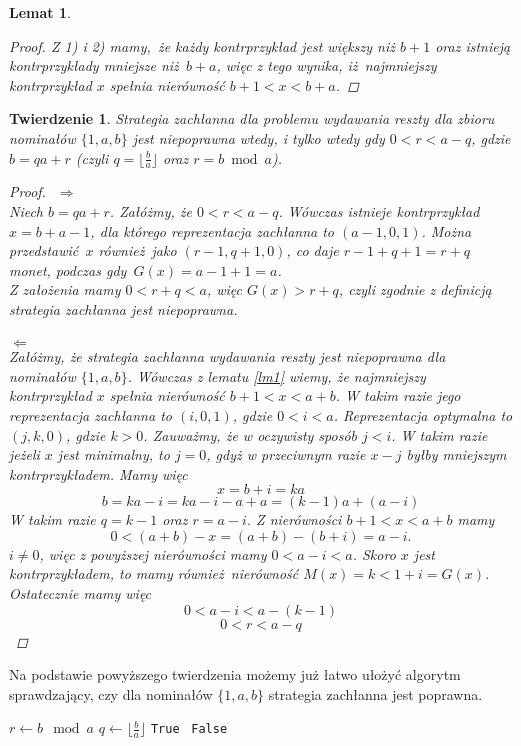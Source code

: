 \documentclass[12pt]{article}
\newtheorem*{theorem*}{Twierdzenie}
\newtheorem{lemma}{Lemat}
\begin{document}
\begin{titlepage}
\begin{lemma}
\begin{proof}
Z 1) i 2) mamy, że każdy kontrprzykład jest większy niż $b + 1$ oraz istnieją
kontrprzykłady mniejsze niż $b + a$, więc z tego wynika, iż najmniejszy
kontrprzykład $x$ spełnia nierówność $b + 1 < x < b + a$.
\end{proof}
\end{lemma}


\begin{theorem*}\normalfont
Strategia zachłanna dla problemu wydawania reszty dla zbioru nominałów 
$\{1, a, b\}$ jest niepoprawna wtedy, i tylko wtedy gdy $0 < r < a - q$,
gdzie $b = qa + r$ (czyli $q = \lfloor \frac{b}{a} \rfloor$ oraz $r = b \bmod a$).

\begin{proof}$ $\newline
$\Rightarrow$\\
Niech $b = qa + r$. Załóżmy, że $0 < r < a - q$. Wówczas istnieje
kontrprzykład $x = b + a - 1$, dla którego reprezentacja zachłanna to $(a - 1, 0, 1)$.
Można przedstawić $x$ również jako $(r - 1, q + 1, 0)$, co daje $r-1+q+1=r+q$ monet,
podczas gdy $G(x) = a - 1 + 1 = a$.\\
Z założenia mamy $0 < r + q < a$, więc $G(x) > r+q$, czyli zgodnie z definicją
strategia zachłanna jest niepoprawna.\\\\
$\Leftarrow$\\
Załóżmy, że strategia zachłanna wydawania reszty jest niepoprawna dla nominałów
$\{1, a, b\}$. Wówczas z lematu \ref{lm1} wiemy, że najmniejszy
kontrprzykład $x$ spełnia nierówność $b + 1 < x < a + b$. W takim razie jego 
reprezentacja zachłanna to $(i, 0, 1)$, gdzie $0 < i < a$. Reprezentacja optymalna
to $(j, k, 0)$, gdzie $k > 0$. Zauważmy, że w oczywisty sposób $j < i$. 
W takim razie jeżeli $x$ jest minimalny, to $j = 0$, gdyż w przeciwnym 
razie $x - j$ byłby mniejszym kontrprzykładem.
Mamy więc
$$x = b + i = ka$$
$$b = ka - i = ka - i - a + a = (k-1)a + (a-i)$$
W takim razie $q = k - 1$ oraz $r = a - i$.
Z nierówności $b + 1 < x < a + b$ mamy
$$0 < (a + b) - x = (a + b) - (b + i) = a - i.$$
$i \neq 0$, więc z powyższej nierówności mamy $0< a - i < a$.
Skoro $x$ jest kontrprzykładem, to mamy również nierówność 
$M(x) = k < 1 + i = G(x)$.\\

Ostatecznie mamy więc
$$0 < a - i < a - (k - 1)$$
$$0 < r < a - q$$
\end{proof}

\end{theorem*}

Na podstawie powyższego twierdzenia możemy już łatwo ułożyć algorytm sprawdzający,
czy dla nominałów $\{1, a, b\}$ strategia zachłanna jest poprawna.

\begin{algorithmic}
    \State $r \gets b \mod a$
    \State $q \gets \lfloor \frac{b}{a} \rfloor$
        \Return \texttt{True}
    \Else $\,$
        \Return \texttt{False}
    \EndIf
\end{algorithmic}

\end{titlepage}
\end{document}
